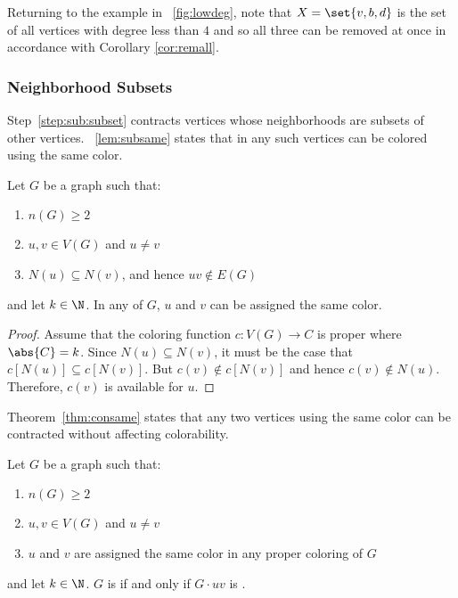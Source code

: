 Returning to the example in \figurename~\ref{fig:lowdeg}, note that \(X=\set{v,b,d}\) is the set of all vertices
with degree less than \(4\) and so all three can be removed at once in accordance with Corollary \ref{cor:remall}.

\subsubsection{Neighborhood Subsets}\label{sec:sub:sub:subset}

Step~\ref{step:sub:subset} contracts vertices whose neighborhoods are subsets of other vertices.
\lemmaname~\ref{lem:subsame} states that in any  such vertices can be colored using the same color.

\begin{lemma}
  \label{lem:subsame}
  Let \(G\) be a graph such that:
  \begin{enumerate}
  \item \(n(G)\ge 2\)
  \item \(u,v\in V(G)\) and \(u\ne v\)
  \item \(N(u)\subseteq N(v)\), and hence \(uv\notin E(G)\)
  \end{enumerate}
  and let \(k\in\N\).  In any  of \(G\), \(u\) and \(v\) can be assigned the same color.
\end{lemma}

\begin{proof}
  Assume that the coloring function \(c:V(G)\to C\) is proper where \(\abs{C}=k\).  Since \(N(u)\subseteq N(v)\),
  it must be the case that \(c[N(u)]\subseteq c[N(v)]\).  But \(c(v)\notin c[N(v)]\) and hence \(c(v)\notin N(u)\).
  Therefore, \(c(v)\) is available for \(u\).
\end{proof}

Theorem~\ref{thm:consame} states that any two vertices using the same color can be contracted without affecting
colorability.

\begin{theorem}
  \label{thm:consame}
  Let \(G\) be a graph such that:
  \begin{enumerate}
  \item \(n(G)\ge 2\)
  \item \(u,v\in V(G)\) and \(u\ne v\)
  \item \(u\) and \(v\) are assigned the same color in any proper coloring of \(G\)
  \end{enumerate}
  and let \(k\in\N\).  \(G\) is  if and only if \(G\cdot uv\) is .
\end{theorem}


